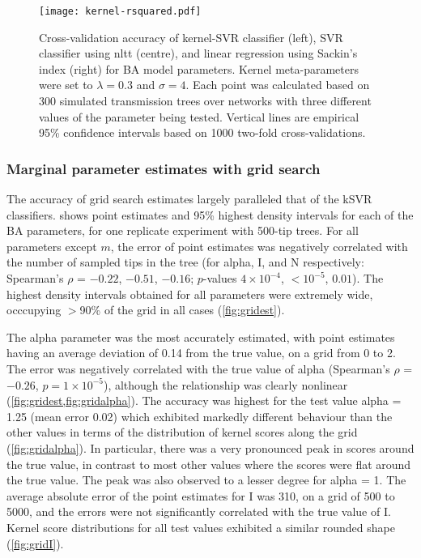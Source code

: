 \begin{figure}[ht]
  \centering
  \texttt{[image: kernel-rsquared.pdf]}
  \caption{
      Cross-validation accuracy of kernel-SVR classifier (left), SVR classifier
      using \gls{nltt} (centre), and linear regression using Sackin's index
      (right) for \gls{BA} model parameters. Kernel meta-parameters were set to
      $\lambda = 0.3$ and $\sigma = 4$. Each point was calculated based on 300
      simulated transmission trees over networks with three different values of
      the parameter being tested. Vertical lines are empirical 95\% confidence
      intervals based on 1000 two-fold cross-validations.
  }
  \label{fig:rsquared}
\end{figure}

\subsubsection*{Marginal parameter estimates with grid search}



The accuracy of grid search estimates largely paralleled that of the \gls{kSVR}
classifiers.  shows point estimates and 95\% highest density
intervals for each of the \gls{BA} parameters, for one replicate experiment
with 500-tip trees. For all parameters except $m$, the error of point estimates
was negatively correlated with the number of sampled tips in the tree (for
\gls{alpha}, \gls{I}, and \gls{N} respectively: Spearman's $\rho$ = 
    \ensuremath{-0.22},
    \ensuremath{-0.51},
    \ensuremath{-0.16};
$p$-values
    $4\!\times\!10^{-4}$,
    ${<}10^{-5}$,
    $0.01$).
The highest density intervals obtained for all parameters were extremely wide,
occcupying $>$90\% of the grid in all cases (\cref{fig:gridest}).

The \gls{alpha} parameter was the most accurately estimated, with point
estimates having an average deviation of 
    0.14
from the true value, on a grid from 0 to 2. The error was negatively correlated
with the true value of \gls{alpha} 
    (Spearman's $\rho$ = \ensuremath{-0.26},
     $p = 1\!\times\!10^{-5}$),
although the relationship was clearly nonlinear (\cref{fig:gridest,fig:gridalpha}).
The accuracy was highest for the test value \gls{alpha} = 1.25
    (mean error 0.02)
which exhibited markedly different behaviour than the other values in terms of
the distribution of kernel scores along the grid (\cref{fig:gridalpha}). In
particular, there was a very pronounced peak in scores around the true value,
in contrast to most other values where the scores were flat around the true
value. The peak was also observed to a lesser degree for \gls{alpha} = 1. The
average absolute error of the point estimates for \gls{I} was 
    310,
on a grid of 500 to 5000, and the errors were not significantly correlated with
the true value of \gls{I}. Kernel score distributions for all test values
exhibited a similar rounded shape (\cref{fig:gridI}). 


